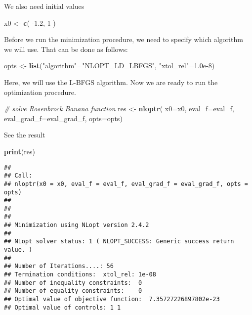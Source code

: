 \documentclass[onecolumn]{article}
\newenvironment{Shaded}{\begin{snugshade}}{\end{snugshade}}
\newcommand{\KeywordTok}[1]{\textcolor[rgb]{0.13,0.29,0.53}{\textbf{#1}}}
\newcommand{\DataTypeTok}[1]{\textcolor[rgb]{0.13,0.29,0.53}{#1}}
\newcommand{\DecValTok}[1]{\textcolor[rgb]{0.00,0.00,0.81}{#1}}
\newcommand{\FloatTok}[1]{\textcolor[rgb]{0.00,0.00,0.81}{#1}}
\newcommand{\StringTok}[1]{\textcolor[rgb]{0.31,0.60,0.02}{#1}}
\newcommand{\CommentTok}[1]{\textcolor[rgb]{0.56,0.35,0.01}{\textit{#1}}}
\newcommand{\NormalTok}[1]{#1}
\begin{document}
We also need initial values

\begin{Shaded}
\begin{Highlighting}[]
\NormalTok{x0 <-}\StringTok{ }\KeywordTok{c}\NormalTok{( }\FloatTok{-1.2}\NormalTok{, }\DecValTok{1}\NormalTok{ )}
\end{Highlighting}
\end{Shaded}

Before we run the minimization procedure, we need to specify which
algorithm we will use. That can be done as follows:

\begin{Shaded}
\begin{Highlighting}[]
\NormalTok{opts <-}\StringTok{ }\KeywordTok{list}\NormalTok{(}\StringTok{"algorithm"}\NormalTok{=}\StringTok{"NLOPT_LD_LBFGS"}\NormalTok{,}
\StringTok{"xtol_rel"}\NormalTok{=}\FloatTok{1.0e-8}\NormalTok{)}
\end{Highlighting}
\end{Shaded}

Here, we will use the L-BFGS algorithm. Now we are ready to run the
optimization procedure.

\begin{Shaded}
\begin{Highlighting}[]
\CommentTok{# solve Rosenbrock Banana function}
\NormalTok{res <-}\StringTok{ }\KeywordTok{nloptr}\NormalTok{( }\DataTypeTok{x0=}\NormalTok{x0,}
\DataTypeTok{eval_f=}\NormalTok{eval_f,}
\DataTypeTok{eval_grad_f=}\NormalTok{eval_grad_f,}
\DataTypeTok{opts=}\NormalTok{opts)}
\end{Highlighting}
\end{Shaded}

See the result

\begin{Shaded}
\begin{Highlighting}[]
\KeywordTok{print}\NormalTok{(res)}
\end{Highlighting}
\end{Shaded}

\begin{verbatim}
## 
## Call:
## nloptr(x0 = x0, eval_f = eval_f, eval_grad_f = eval_grad_f, opts = opts)
## 
## 
## 
## Minimization using NLopt version 2.4.2 
## 
## NLopt solver status: 1 ( NLOPT_SUCCESS: Generic success return value. )
## 
## Number of Iterations....: 56 
## Termination conditions:  xtol_rel: 1e-08 
## Number of inequality constraints:  0 
## Number of equality constraints:    0 
## Optimal value of objective function:  7.35727226897802e-23 
## Optimal value of controls: 1 1
\end{verbatim}
\end{document}
